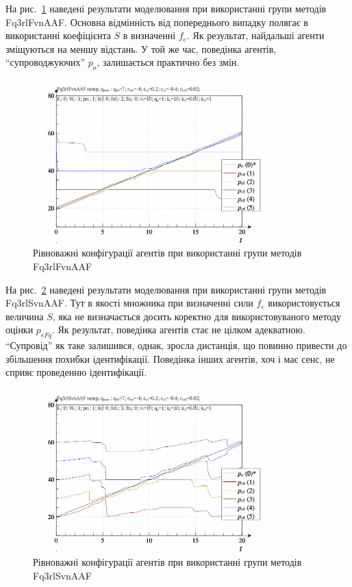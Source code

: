 На рис.~\ref{atu:f:qls_ramp_Fq3rlFvnAAF} наведені результати моделювання
при використанні групи методів Fq3rlFvnAAF. Основна відмінність від
попереднього випадку полягає в використанні коефіцієнта
$S$ в визначенні
$ f_e $. Як результат, найдальші агенти зміщуються на меншу
відстань. У той же час, поведінка агентів, ``супроводжуючих'' $p_o $, залишається практично без змін.


\begin{figure}[htb!]
  \begin{center}
    \includegraphics[width=0.8\textwidth]{p/ramp/qls-p_t_pi_Fq3rlFvnAAF_ramp.png}
  \end{center}
  \caption{Рівноважні конфігурації агентів при використанні групи методів Fq3rlFvnAAF}
  \label{atu:f:qls_ramp_Fq3rlFvnAAF}
\end{figure}

На рис.~\ref{atu:f:qls_ramp_Fq3rlSvnAAF} наведені результати моделювання при
використанні групи методів Fq3rlSvnAAF. Тут в якості множника при визначенні
сили
$ f_e $ використовується величина
$ S $, яка не визначається досить коректно для використовуваного
методу оцінки
$ p_{eFq} $. Як результат, поведінка агентів стає не цілком
адекватною. ``Супровід'' як таке залишився, однак,
зросла дистанція, що повинно привести до збільшення похибки
ідентифікації. Поведінка інших агентів, хоч і має сенс, не
сприяє проведенню ідентифікації.

\begin{figure}[htb!]
  \begin{center}
    \includegraphics[width=0.8\textwidth]{p/ramp/qls-p_t_pi_Fq3rlSvnAAF_ramp.png}
  \end{center}
  \caption{Рівноважні конфігурації агентів при використанні групи методів Fq3rlSvnAAF}
  \label{atu:f:qls_ramp_Fq3rlSvnAAF}
\end{figure}


